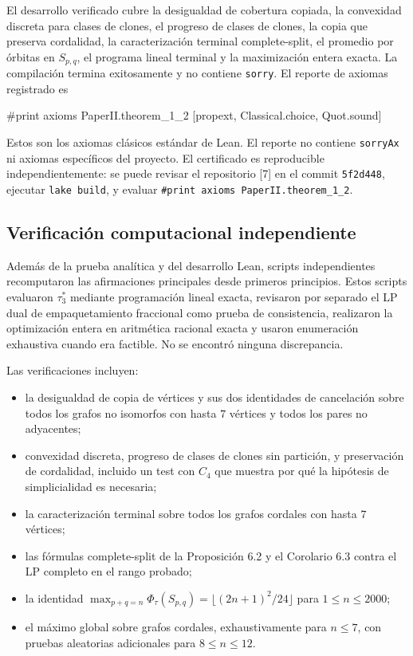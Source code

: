 \documentclass[
  11pt,
]{article}
\newenvironment{Shaded}{}{}
\newcommand{\NormalTok}[1]{#1}
\providecommand{\tightlist}{%
  \setlength{\itemsep}{0pt}\setlength{\parskip}{0pt}}
\begin{document}
El desarrollo verificado cubre la desigualdad de cobertura copiada, la
convexidad discreta para clases de clones, el progreso de clases de
clones, la copia que preserva cordalidad, la caracterización terminal
complete-split, el promedio por órbitas en \(S_{p,q}\), el programa
lineal terminal y la maximización entera exacta. La compilación termina
exitosamente y no contiene \texttt{sorry}. El reporte de axiomas
registrado es

\begin{Shaded}
\begin{Highlighting}[]
\NormalTok{\#print axioms PaperII.theorem\_1\_2}
\NormalTok{[propext, Classical.choice, Quot.sound]}
\end{Highlighting}
\end{Shaded}

Estos son los axiomas clásicos estándar de Lean. El reporte no contiene
\texttt{sorryAx} ni axiomas específicos del proyecto. El certificado es
reproducible independientemente: se puede revisar el repositorio {[}7{]}
en el commit \texttt{5f2d448}, ejecutar \texttt{lake\ build}, y evaluar
\texttt{\#print\ axioms\ PaperII.theorem\_1\_2}.

\subsection{Verificación computacional
independiente}\label{verificaciuxf3n-computacional-independiente}

Además de la prueba analítica y del desarrollo Lean, scripts
independientes recomputaron las afirmaciones principales desde primeros
principios. Estos scripts evaluaron \(\tau_3^*\) mediante programación
lineal exacta, revisaron por separado el LP dual de empaquetamiento
fraccional como prueba de consistencia, realizaron la optimización
entera en aritmética racional exacta y usaron enumeración exhaustiva
cuando era factible. No se encontró ninguna discrepancia.

Las verificaciones incluyen:

\begin{itemize}
\tightlist
\item
  la desigualdad de copia de vértices y sus dos identidades de
  cancelación sobre todos los grafos no isomorfos con hasta \(7\)
  vértices y todos los pares no adyacentes;
\item
  convexidad discreta, progreso de clases de clones sin partición, y
  preservación de cordalidad, incluido un test con \(C_4\) que muestra
  por qué la hipótesis de simplicialidad es necesaria;
\item
  la caracterización terminal sobre todos los grafos cordales con hasta
  \(7\) vértices;
\item
  las fórmulas complete-split de la Proposición 6.2 y el Corolario 6.3
  contra el LP completo en el rango probado;
\item
  la identidad
  \(\max_{p+q=n}\Phi_\tau(S_{p,q})=\lfloor(2n+1)^2/24\rfloor\) para
  \(1\le n\le2000\);
\item
  el máximo global sobre grafos cordales, exhaustivamente para
  \(n\le7\), con pruebas aleatorias adicionales para \(8\le n\le12\).
\end{itemize}
\end{document}

